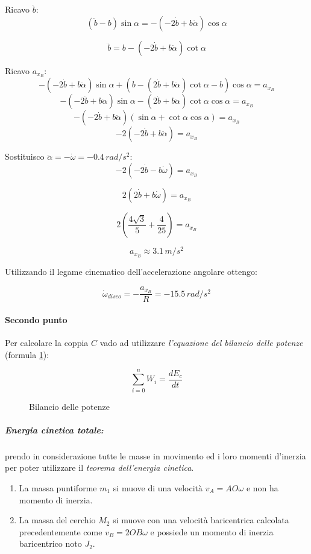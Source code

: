 \documentclass[main.tex]{subfiles}
\begin{document}
Ricavo $\ddot{b}$:
\[
	(\ddot{b}- b)\sin\alpha = - (-2\dot{b} + b\ddot{\alpha})\cos\alpha
\]

\[
	\ddot{b} = b - (-2\dot{b} + b\ddot{\alpha})\cot\alpha
\]

Ricavo $a_{x_B}$:
\[
	-(-2\dot{b} + b\ddot{\alpha})\sin\alpha + (b - (2\dot{b} + b\ddot{\alpha})\cot\alpha - b)\cos\alpha = a_{x_B}
\]
\[
	-(-2\dot{b} + b\ddot{\alpha})\sin\alpha - (2\dot{b} + b\ddot{\alpha})\cot\alpha\cos\alpha = a_{x_B}
\]
\[
	-(-2\dot{b} + b\ddot{\alpha})(\sin\alpha +\cot\alpha\cos\alpha) = a_{x_B}
\]
\[
	-2(-2\dot{b} + b\ddot{\alpha}) = a_{x_B}
\]

Sostituisco $\ddot{\alpha}=-\dot{\omega} = -0.4\,rad/s^2$:
\[
	-2(-2\dot{b} - b\dot{\omega}) = a_{x_B}
\]

\[
	2(2\dot{b} + b\dot{\omega}) = a_{x_B}
\]

\[
	2(\frac{4\sqrt{3}}{5} + \frac{4}{25}) = a_{x_B}
\]

\[
	a_{x_B} \approx 3.1\,m/s^2
\]

Utilizzando il legame cinematico dell'accelerazione angolare ottengo:

\[
	\dot{\omega}_{disco} = -\frac{a_{x_B}}{R} = -15.5\,rad/s^2
\]

\paragraph{Secondo punto}

Per calcolare la coppia $C$ vado ad utilizzare \textit{l'equazione del bilancio delle potenze} (formula \ref{bilancio_potenze_2207}):

\begin{figure}[H]
	\[
		\sum_{i=0}^n W_i = \frac{dE_c}{dt}
	\]
	\caption{Bilancio delle potenze}
	\label{bilancio_potenze_2207}
\end{figure}

\subparagraph{Energia cinetica totale:} prendo in considerazione tutte le masse in movimento ed i loro momenti d'inerzia per poter utilizzare il \textit{teorema dell'energia cinetica}.

\begin{enumerate}
	\item La massa puntiforme $m_1$ si muove di una velocità $v_A = AO\omega$ e non ha momento di inerzia.
	\item La massa del cerchio $M_2$ si muove con una velocità baricentrica calcolata precedentemente come $v_B = 2OB\omega$ e possiede un momento di inerzia baricentrico noto $J_2$.
\end{enumerate}
\end{document}
